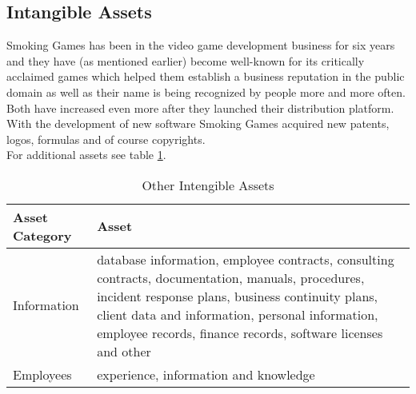 \subsection{Intangible Assets}
Smoking Games has been in the video game development business for six years and they have (as mentioned earlier) become well-known for its critically acclaimed games which helped them establish a business reputation in the public domain as well as their name is being recognized by people more and more often. Both have increased even more after they launched their distribution platform.\\
With the development of new software Smoking Games acquired new patents, logos, formulas and of course copyrights.\\
For additional assets see table \ref{tab:OtherTangibleAssets}. 
\begin{table}[h]
	\centering
	\begin{tabular}{l | l}
		\textbf{Asset Category} & \textbf{Asset}\\\hline\hline
		Information & \parbox[t]{7cm}{database information, employee contracts, consulting contracts, documentation,
manuals, procedures, incident response plans, business continuity plans, client data and
information, personal information, employee records, finance records, software licenses
and other}\\\hline
		Employees & \parbox[t]{7cm}{experience, information and knowledge}
	\end{tabular}
	\caption{Other Intengible Assets}\label{tab:OtherTangibleAssets}
\end{table}